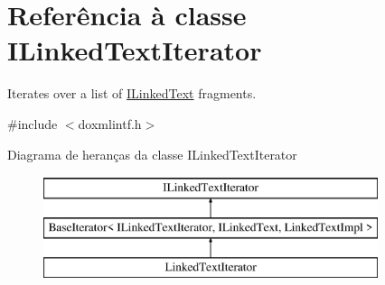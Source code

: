 \hypertarget{class_i_linked_text_iterator}{\section{Referência à classe I\-Linked\-Text\-Iterator}
\label{class_i_linked_text_iterator}
}


Iterates over a list of \hyperlink{class_i_linked_text}{I\-Linked\-Text} fragments.  




{\ttfamily \#include $<$doxmlintf.\-h$>$}

Diagrama de heranças da classe I\-Linked\-Text\-Iterator\begin{figure}[H]
\begin{center}
\leavevmode
\includegraphics[height=3.000000cm]{class_i_linked_text_iterator}
\end{center}
\end{figure}

